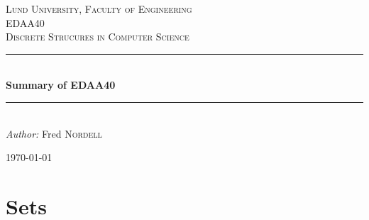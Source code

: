 \documentclass[12pt]{article} %
\begin{document}

\begin{titlepage}

\newcommand{\HRule}{\rule{\linewidth}{0.5mm}} %

\center %

\textsc{\LARGE Lund University, Faculty of Engineering}\\[1.5cm] %
\textsc{\Large EDAA40}\\[0.5cm] %
\textsc{\large Discrete Strucures in Computer Science}\\[0.5cm] %

\HRule \\[1cm]
{ \huge \bfseries Summary of EDAA40}\\[0.4cm] %
\HRule \\[1.5cm]

\emph{Author:} Fred \textsc{Nordell} %

{\large \today}\\[3cm] %


\vfill %

\end{titlepage}


\tableofcontents %

\newpage %


\section{Sets} %
\end{document}
